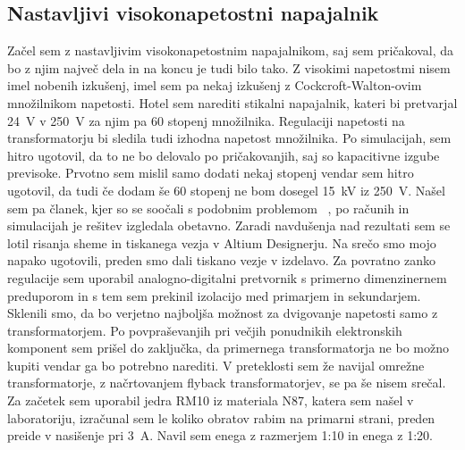 \documentclass[a4paper,twoside,openright,12pt,slovene]{book}
\begin{document}
	\subsection{Nastavljivi visokonapetostni napajalnik}
	Začel sem z nastavljivim visokonapetostnim napajalnikom, saj sem pričakoval, da bo z njim največ dela in na koncu je tudi bilo tako. Z visokimi napetostmi nisem imel nobenih izkušenj, imel sem pa nekaj izkušenj z Cockcroft-Walton-ovim množilnikom napetosti. Hotel sem narediti stikalni napajalnik, kateri bi pretvarjal \SI{24}{\volt} v \SI{250}{\volt} za njim pa 60 stopenj množilnika. Regulaciji napetosti na transformatorju bi sledila tudi izhodna napetost množilnika. Po simulacijah, sem hitro ugotovil, da to ne bo delovalo po pričakovanjih, saj so kapacitivne izgube previsoke. Prvotno sem mislil samo dodati nekaj stopenj vendar sem hitro ugotovil, da tudi če dodam še 60 stopenj ne bom dosegel \SI{15}{\kilo\volt} iz \SI{250}{\volt}. Našel sem pa članek, kjer so se soočali s podobnim problemom ~\cite{ParallelHighVoltageMultipliers}, po računih in simulacijah je rešitev izgledala obetavno. Zaradi navdušenja nad rezultati sem se lotil risanja sheme in tiskanega vezja v Altium Designerju. Na srečo smo mojo napako ugotovili, preden smo dali tiskano vezje v izdelavo. Za povratno zanko regulacije sem uporabil analogno-digitalni pretvornik s primerno dimenzinernem preduporom in s tem sem prekinil izolacijo med primarjem in sekundarjem. Sklenili smo, da bo verjetno najboljša možnost za dvigovanje napetosti samo z transformatorjem. Po povpraševanjih pri večjih ponudnikih elektronskih komponent sem prišel do zaključka, da primernega transformatorja ne bo možno kupiti vendar ga bo potrebno narediti. V preteklosti sem že navijal omrežne transformatorje, z načrtovanjem flyback transformatorjev, se pa še nisem srečal. Za začetek sem uporabil jedra RM10 iz materiala N87, katera sem našel v laboratoriju, izračunal sem le koliko obratov rabim na primarni strani, preden preide v nasišenje pri \SI{3}{\ampere}. Navil sem enega z razmerjem 1:10 in enega z 1:20.
\end{document}
